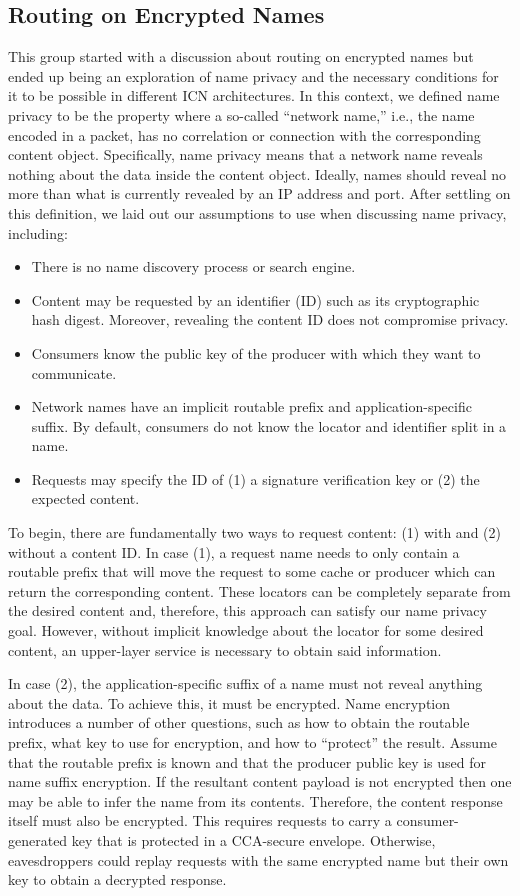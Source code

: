 \subsection{Routing on Encrypted Names}
This group started with a discussion about routing on encrypted names but ended up being an exploration of name privacy and the necessary conditions for it to be possible in different ICN architectures. In this context, we defined name privacy to be the property where a so-called ``network name,'' i.e., the name encoded in a packet, has no correlation or connection with the corresponding content object. Specifically, name privacy means that a network name reveals nothing about the data inside the content object. Ideally, names should reveal no more than what is currently revealed by an IP address and port. After settling on this definition, we laid out our assumptions to use when discussing name privacy, including:

\begin{itemize}
\item There is no name discovery process or search engine.
\item Content may be requested by an identifier (ID) such as its cryptographic hash digest. Moreover, revealing the content ID does not compromise privacy.
\item Consumers know the public key of the producer with which they want to communicate.
\item Network names have an implicit routable prefix and application-specific suffix. By default, consumers do not know the locator and identifier split in a name.
\item Requests may specify the ID of (1) a signature verification key or (2) the expected content.
\end{itemize}

To begin, there are fundamentally two ways to request content: (1) with and (2) without a content ID. In case (1), a request name needs to only contain a routable prefix that will move the request to some cache or producer which can return the corresponding content. These locators can be completely separate from the desired content and, therefore, this approach can satisfy our name privacy goal. However, without implicit knowledge about the locator for some desired content, an upper-layer service is necessary to obtain said information.

In case (2), the application-specific suffix of a name must not reveal anything about the data. To achieve this, it must be encrypted. Name encryption introduces a number of other questions, such as how to obtain the routable prefix, what key to use for encryption, and how to ``protect'' the result. Assume that the routable prefix is known and that the producer public key is used for name suffix encryption. If the resultant content payload is not encrypted then one may be able to infer the name from its contents. Therefore, the content response itself must also be encrypted. This requires requests to carry a consumer-generated key that is protected in a CCA-secure envelope. Otherwise, eavesdroppers could replay requests with the same encrypted name but their own key to obtain a decrypted response.

